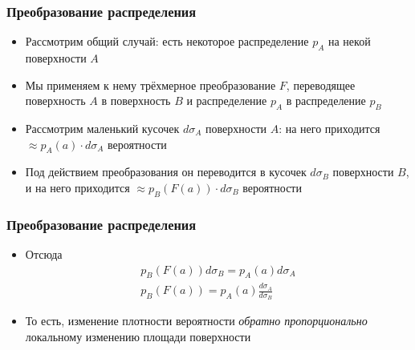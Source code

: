 \documentclass[10pt]{beamer}
\begin{document}
\begin{frame}
\frametitle{Преобразование распределения}
\begin{itemize}
\item Рассмотрим общий случай: есть некоторое распределение \begin{math}p_A\end{math} на некой поверхности \begin{math}A\end{math}
\pause
\item Мы применяем к нему трёхмерное преобразование \begin{math}F\end{math}, переводящее поверхность \begin{math}A\end{math} в поверхность \begin{math}B\end{math} и распределение \begin{math}p_A\end{math} в распределение \begin{math}p_B\end{math}
\pause
\item Рассмотрим маленький кусочек \begin{math}d\sigma_A\end{math} поверхности \begin{math}A\end{math}: на него приходится \begin{math}\approx p_A(a) \cdot d\sigma_A\end{math} вероятности
\pause
\item Под действием преобразования он переводится в кусочек \begin{math}d\sigma_B\end{math} поверхности \begin{math}B\end{math}, и на него приходится \begin{math}\approx p_B(F(a)) \cdot d\sigma_B\end{math} вероятности
\end{itemize}
\end{frame}

\begin{frame}
\frametitle{Преобразование распределения}
\begin{itemize}
\item Отсюда
\begin{gather*}
p_B(F(a)) d\sigma_B = p_A(a) d\sigma_A \\
p_B(F(a)) = p_A(a) \frac{d\sigma_A}{d\sigma_B}
\end{gather*}
\pause
\item То есть, изменение плотности вероятности \textit{обратно пропорционально} локальному изменению площади поверхности
\end{itemize}
\end{frame}
\end{document}
